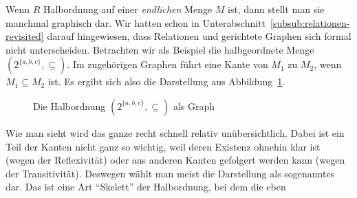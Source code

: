 Wenn $R$ Halbordnung auf einer \emph{endlichen} Menge $M$ ist, dann
stellt man sie manchmal graphisch dar. Wir hatten schon in
Unterabschnitt~\ref{subsub:relationen-revisited} darauf hingewiesen,
dass Relationen und gerichtete Graphen sich formal nicht
unterscheiden. Betrachten wir als Beispiel die halbgeordnete Menge
$(2^{\{a,b,c\}}, \subseteq)$. Im zugehörigen Graphen führt eine Kante
von $M_1$ zu $M_2$, wenn $M_1\subseteq M_2$ ist. Es ergibt sich also
die Darstellung aus Abbildung~\ref{fig:halbord-graph}. 
\begin{figure}[ht]
  \centering
  \caption{Die Halbordnung $(2^{\{a,b,c\}}, \subseteq)$ als Graph}
  \label{fig:halbord-graph}
\end{figure}
%
Wie man sieht wird das ganze recht schnell relativ
unübersichtlich. Dabei ist ein Teil der Kanten nicht ganz so wichtig,
weil deren Existenz ohnehin klar ist (wegen der Reflexivität) oder aus
anderen Kanten gefolgert werden kann (wegen der
Transitivität). Deswegen wählt man meist die Darstellung als
sogenanntes  dar. Das
ist eine Art "`Skelett"' der Halbordnung, bei dem die eben
